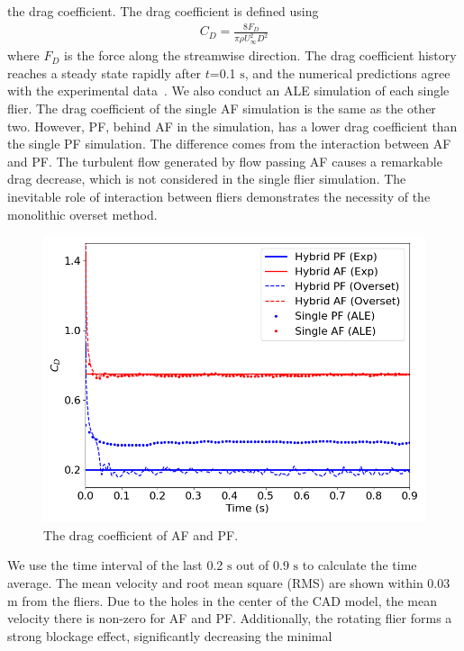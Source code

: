 \documentclass[preprint,12pt,sort&compress]{elsarticle}
\theoremstyle{definition}%
\begin{document}
the drag coefficient. The drag coefficient is defined using
\begin{align}
C_D=\frac{8F_D}{\pi \rho U_\infty^2 D^2}
\end{align}
where $F_D$ is the force along the streamwise direction. The drag coefficient history reaches a steady state rapidly after $t$=0.1 $\mathrm{s}$, and the numerical predictions agree
with the experimental data~\cite{kim2023flier}. We also conduct an ALE simulation of each single flier. The drag coefficient of the single AF simulation is the 
same as the other two. However, PF, behind AF in the simulation, has a lower drag coefficient than the single PF simulation. The difference
comes from the interaction between AF and PF. The turbulent flow generated by flow passing AF causes a remarkable drag decrease, which is not 
considered in the single flier simulation. The inevitable role of interaction between fliers demonstrates the necessity of the monolithic 
overset method.
\begin{figure}[!htbp]
    \centering
    \includegraphics[angle=0,width=1.0\textwidth]{fig/flier-drag-coef_1.png}
    \caption{The drag coefficient of AF and PF.}
    \label{fig:flier-drag}
\end{figure}
We use the time interval of the last 0.2 $\mathrm{s}$ out of 0.9 $\mathrm{s}$ to calculate the time average. The mean velocity 
and root mean square (RMS) are shown within 0.03 $\mathrm{m}$ from the fliers. Due to the holes in the center of 
the CAD model, the mean velocity there is non-zero for AF and PF. Additionally, the rotating flier forms a strong blockage effect, significantly decreasing the minimal
\end{document}
